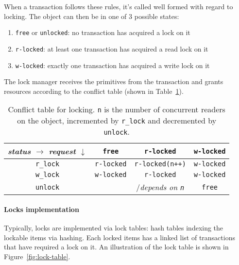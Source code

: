 \documentclass[english]{article}
\begin{document}
When a transaction follows these rules, it's called well formed with regard to locking.
The object can then be in one of \(3\) possible states:

\begin{enumerate}
  \item \texttt{free} or \texttt{unlocked}: no transaction has acquired a lock on it
  \item \texttt{r-locked}: at least one transaction has acquired a read lock on it
  \item \texttt{w-locked}: exactly one transaction has acquired a write lock on it
\end{enumerate}

The lock manager receives the primitives from the transaction and grants resources according to the conflict table (shown in Table~\ref{tab:conflict-table}).

\begin{table}[htbp]
  \bigskip
  \centering
  \begin{tabular}{c|c|c|c}
    \shortstack {\small \smallskip \textit{status} \(\rightarrow\) \\
    \textit{request} \(\downarrow\)} & \texttt{free} & \texttt{r-locked} & \texttt{w-locked} \\
    \hline
    \texttt{r\_lock} &  \texttt{r-locked} &  \texttt{r-locked(n++)}                     &  \texttt{w-locked} \\
    \texttt{w\_lock} &  \texttt{w-locked} &  \texttt{r-locked}                          &  \texttt{w-locked} \\
    \texttt{unlock}  &                    & / \textit{depends on \texttt{n}} &  \texttt{free}
  \end{tabular}
  \bigskip
  \caption{Conflict table for locking. \texttt{n} is the number of concurrent readers on the object, incremented by \texttt{r\_lock} and decremented by \texttt{unlock}.}
  \label{tab:conflict-table}
\end{table}

\paragraph{Locks implementation}

Typically, locks are implemented via lock tables: hash tables indexing the lockable items via hashing.
Each locked items has a linked list of transactions that have required a lock on it.
An illustration of the lock table is shown in Figure~\ref{fig:lock-table}.
\end{document}
